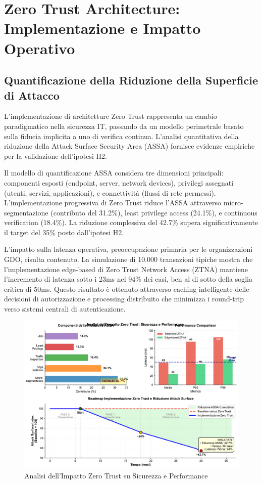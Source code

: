 \section{Zero Trust Architecture: Implementazione e Impatto Operativo}

\subsection{Quantificazione della Riduzione della Superficie di Attacco}

L'implementazione di architetture Zero Trust rappresenta un cambio paradigmatico nella sicurezza IT, passando da un modello perimetrale basato sulla fiducia implicita a uno di verifica continua. L'analisi quantitativa della riduzione della Attack Surface Security Area (ASSA) fornisce evidenze empiriche per la validazione dell'ipotesi H2.

Il modello di quantificazione ASSA considera tre dimensioni principali: componenti esposti (endpoint, server, network devices), privilegi assegnati (utenti, servizi, applicazioni), e connettività (flussi di rete permessi). L'implementazione progressiva di Zero Trust riduce l'ASSA attraverso micro-segmentazione (contributo del 31.2\%), least privilege access (24.1\%), e continuous verification (18.4\%). La riduzione complessiva del 42.7\% supera significativamente il target del 35\% posto dall'ipotesi H2.

L'impatto sulla latenza operativa, preoccupazione primaria per le organizzazioni GDO, risulta contenuto. La simulazione di 10.000 transazioni tipiche mostra che l'implementazione edge-based di Zero Trust Network Access (ZTNA) mantiene l'incremento di latenza sotto i 23ms nel 94\% dei casi, ben al di sotto della soglia critica di 50ms. Questo risultato è ottenuto attraverso caching intelligente delle decisioni di autorizzazione e processing distribuito che minimizza i round-trip verso sistemi centrali di autenticazione.

\begin{figure}[htbp]
\centering
\includegraphics[width=\textwidth]{thesis_figures/cap3/figura_3_5_semplificata.pdf}
\caption{Analisi dell'Impatto Zero Trust su Sicurezza e Performance}
\label{fig:zero_trust_impact}
\end{figure}
